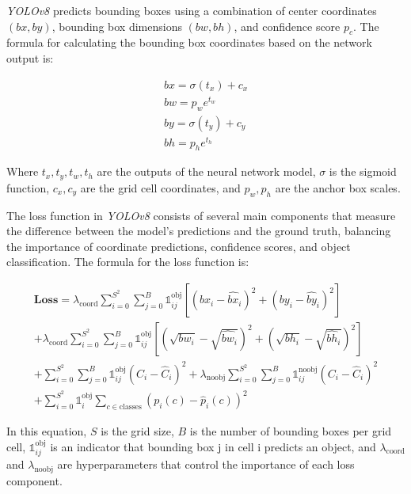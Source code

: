 \emph{YOLOv8} predicts bounding boxes using a combination of center coordinates \((bx, by)\), bounding box dimensions \((bw, bh)\), and confidence score \(p_c\). The formula for calculating the bounding box coordinates based on the network output is:

\begin{equation}
  \begin{array}{c}
  bx = \sigma(t_x) + c_x\\
  bw = p_w e^{t_w}\\
  by = \sigma(t_y) + c_y\\ 
  bh = p_h e^{t_h}
  \end{array}
\end{equation}

Where \(t_x, t_y, t_w, t_h\) are the outputs of the neural network model, \(\sigma\) is the sigmoid function, \(c_x, c_y\) are the grid cell coordinates, and \(p_w, p_h\) are the anchor box scales.

The loss function in \emph{YOLOv8} consists of several main components that measure the difference between the model's predictions and the ground truth, balancing the importance of coordinate predictions, confidence scores, and object classification. The formula for the loss function is:

\begin{equation}
  \begin{array}{c}
  \mathbf{Loss} = \lambda_{\mathrm{coord}} \sum_{i=0}^{S^2} \sum_{j=0}^{B} \mathbb{1}_{ij}^{\mathrm{obj}} \left[ (bx_i - \hat{bx}_i)^2 + (by_i - \hat{by}_i)^2 \right] \\[10pt]
  + \lambda_{\mathrm{coord}} \sum_{i=0}^{S^2} \sum_{j=0}^{B} \mathbb{1}_{ij}^{\mathrm{obj}} \left[ (\sqrt{bw_i} - \sqrt{\hat{bw}_i})^2 + (\sqrt{bh_i} - \sqrt{\hat{bh}_i})^2 \right] \\[10pt]
  + \sum_{i=0}^{S^2} \sum_{j=0}^{B} \mathbb{1}_{ij}^{\mathrm{obj}} (C_i - \hat{C}_i)^2 + \lambda_{\mathrm{noobj}} \sum_{i=0}^{S^2} \sum_{j=0}^{B} \mathbb{1}_{ij}^{\mathrm{noobj}} (C_i - \hat{C}_i)^2 \\[10pt]
  + \sum_{i=0}^{S^2} \mathbb{1}_{i}^{\mathrm{obj}} \sum_{c \in \mathrm{classes}} (p_i(c) - \hat{p}_i(c))^2
  \end{array}
\end{equation}

In this equation, \(S\) is the grid size, \(B\) is the number of bounding boxes per grid cell, \(\mathbb{1}_{ij}^{\mathrm{obj}}\) is an indicator that bounding box j in cell i predicts an object, and \(\lambda_{\mathrm{coord}}\) and \(\lambda_{\mathrm{noobj}}\) are hyperparameters that control the importance of each loss component.

